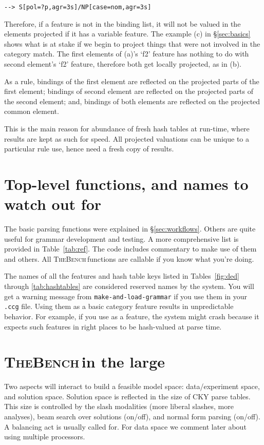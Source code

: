 \documentclass[11pt]{article}
\newcommand{\tool}{\textsc{TheBench}}
\begin{document}
{{ \verb|--> S[pol=?p,agr=3s]/NP[case=nom,agr=3s]|

{Therefore, if a feature is not in the binding list, it will not be valued in the elements projected if it has a variable feature. The example (c) in \S\ref{sec:basics} shows
what is at stake if we begin to project things that were not involved in the category match. The first elements of (a)'s `f2' feature has nothing to do with second
element's `f2' feature, therefore both get locally projected, as in (b).}

{As a rule, bindings of the first element are reflected on the projected parts of the first element; bindings of second element are reflected on the projected
parts of the second element; and, bindings of both elements are reflected on the projected common element.}

{This is the main reason for abundance of fresh hash tables at run-time, where results are kept as such for speed.
All projected valuations can be unique to a particular rule use, hence need a fresh copy of results.}

\section{Top-level functions, and names to watch out for}\label{sec:functions}
The basic parsing  functions were explained in \S\ref{sec:workflows}. Others are quite useful for grammar development and testing. A more
comprehensive list is provided in Table~\ref{tab:ref}. The code
includes commentary to make use of them and others. All \tool\,functions are callable if you know
what you're doing.

{The names of all the features  and hash table keys listed in Tables~\ref{fig:ded} through \ref{tab:hashtables} are considered reserved names by the system.
{You will get a warning message from} \verb+make-and-load-grammar+ {if you use them in your} \verb+.ccg+ file.
Using them as a basic category feature results in unpredictable behavior. For example, if you use  as a feature, the system might crash
because it expects such features in right places to be hash-valued at parse time.}

\section{{\tool\,in the large}}
Two aspects will interact to build a feasible model space: data/experiment space, and solution space. Solution space is reflected in the size of CKY parse tables. This size is controlled by the slash modalities (more liberal slashes, more analyses), beam search over solutions (on/off), and normal form parsing (on/off). A balancing act is usually called for. For data space we comment later about using multiple processors. 


}}
\end{document}
